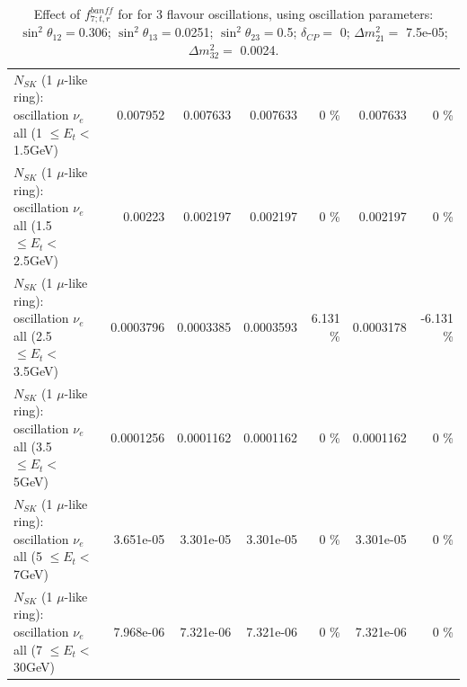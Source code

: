 \begin{table}
\begin{tabular}{| l | r | r | r  r | r  r |}
$N_{SK}$ (1 $\mu$-like ring): oscillation $\nu_{e}$ all (1 $\leq E_{t} <$ 1.5GeV) &        0.007952 &        0.007633 &        0.007633 &        0 \%  &        0.007633 &        0 \%  \\ 
$N_{SK}$ (1 $\mu$-like ring): oscillation $\nu_{e}$ all (1.5 $\leq E_{t} <$ 2.5GeV) &         0.00223 &        0.002197 &        0.002197 &        0 \%  &        0.002197 &        0 \%  \\ 
$N_{SK}$ (1 $\mu$-like ring): oscillation $\nu_{e}$ all (2.5 $\leq E_{t} <$ 3.5GeV) &       0.0003796 &       0.0003385 &       0.0003593 &    6.131 \%  &       0.0003178 &   -6.131 \%  \\ 
$N_{SK}$ (1 $\mu$-like ring): oscillation $\nu_{e}$ all (3.5 $\leq E_{t} <$ 5GeV) &       0.0001256 &       0.0001162 &       0.0001162 &        0 \%  &       0.0001162 &        0 \%  \\ 
 $N_{SK}$ (1 $\mu$-like ring): oscillation $\nu_{e}$ all (5 $\leq E_{t} <$ 7GeV) &       3.651e-05 &       3.301e-05 &       3.301e-05 &        0 \%  &       3.301e-05 &        0 \%  \\ 
$N_{SK}$ (1 $\mu$-like ring): oscillation $\nu_{e}$ all (7 $\leq E_{t} <$ 30GeV) &       7.968e-06 &       7.321e-06 &       7.321e-06 &        0 \%  &       7.321e-06 &        0 \%  \\ 
\hline
\hline
\end{tabular}
\caption{ Effect of $f_{7; t, r}^{banff}$ for for 3 flavour oscillations, using oscillation parameters:  $\sin^2\theta_{12} = $0.306; $\sin^2\theta_{13} = $0.0251; $\sin^2\theta_{23} = $0.5; $\delta_{CP} = $        0; $\Delta m^2_{21} = $    7.5e-05; $\Delta m^2_{32} = $    0.0024. }
\label{tab:num_banff_07_1RmuT_3f_osc_t13:0.0251}
\end{table}
\clearpage
